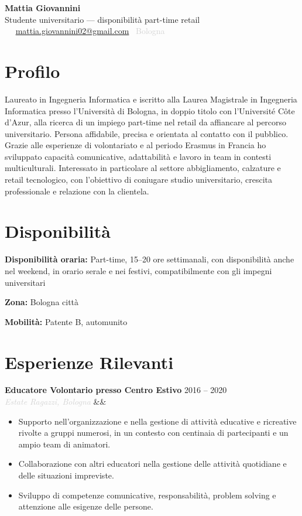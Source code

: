 \documentclass[a4paper,10pt]{article}
\newcommand{\entrylist}[5]{%
  \noindent\textbf{#1} \hfill \textcolor{accent}{#2}\\
  \textit{\textcolor{lightgray}{#3}}%
  \ifx&#4&\else\\\vspace{0.15em}#4\fi
  \vspace{0.2em}
  \begin{itemize}#5\end{itemize}
  \vspace{0.25em}
}
\newcommand{\skillgroup}[2]{%
  \noindent\textbf{#1:} #2\par\vspace{0.25em}
}
\begin{document}
\begin{center}
  {\Huge\bfseries\color{darkgray} Mattia Giovannini}\\[0.35em]
  {\large\color{accent} Studente universitario — disponibilità part-time retail}\\[0.65em]
  \textcolor{lightgray}{
    \faPhone\ \PrivatePhone
    \quad\textbullet\quad
    \faEnvelope\ \href{mailto:mattia.giovannini02@gmail.com}{mattia.giovannini02@gmail.com}
    \quad\textbullet\quad
    \faMapMarker*\ Bologna
  }
\end{center}

\vspace{0.35em}

\section{Profilo}

Laureato in Ingegneria Informatica e iscritto alla Laurea Magistrale in Ingegneria Informatica presso l'Università di Bologna, in doppio titolo con l'Université Côte d'Azur, alla ricerca di un impiego part-time nel retail da affiancare al percorso universitario. Persona affidabile, precisa e orientata al contatto con il pubblico. Grazie alle esperienze di volontariato e al periodo Erasmus in Francia ho sviluppato capacità comunicative, adattabilità e lavoro in team in contesti multiculturali. Interessato in particolare al settore abbigliamento, calzature e retail tecnologico, con l'obiettivo di coniugare studio universitario, crescita professionale e relazione con la clientela.

\section{Disponibilità}

\skillgroup{Disponibilità oraria}{Part-time, 15--20 ore settimanali, con disponibilità anche nel weekend, in orario serale e nei festivi, compatibilmente con gli impegni universitari}
\skillgroup{Zona}{Bologna città}
\skillgroup{Mobilità}{Patente B, automunito}

\section{Esperienze Rilevanti}

\entrylist{Educatore Volontario presso Centro Estivo}{2016 -- 2020}{Estate Ragazzi, Bologna}{}{
  \item Supporto nell'organizzazione e nella gestione di attività educative e ricreative rivolte a gruppi numerosi, in un contesto con centinaia di partecipanti e un ampio team di animatori.
  \item Collaborazione con altri educatori nella gestione delle attività quotidiane e delle situazioni impreviste.
  \item Sviluppo di competenze comunicative, responsabilità, problem solving e attenzione alle esigenze delle persone.
}
\end{document}
